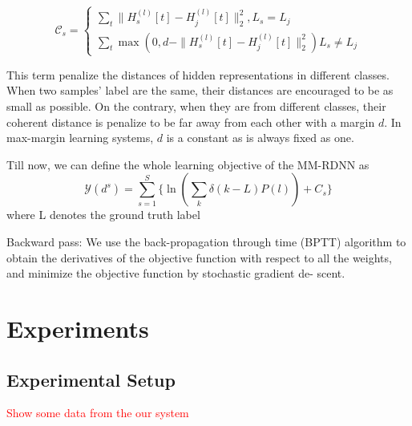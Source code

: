 \documentclass[journal]{IEEEtran}
\begin{document}
\begin{equation}
\mathcal{C}_s=
\begin{cases}
\sum_t\|H^{(l)}_s[t]-H^{(l)}_j[t]\|_2^2,  L_s=L_j\\
\sum_t \max(0,d-\|H^{(l)}_s[t]-H^{(l)}_j[t]\|_2^2)  L_s \neq L_j
\end{cases}
\end{equation}

This term penalize the distances of hidden representations in different classes. When two samples' label are the same, their distances are encouraged to be as small as possible. On the contrary, when they are from different classes, their coherent  distance is penalize to be far away from each other with a margin $d$. In max-margin learning systems, $d$ is a  constant as is always fixed  as one.

Till now, we can define the whole learning objective of the MM-RDNN as
\begin{equation}
\mathcal{Y}(d^s)= \sum_{s=1}^{S} \{ \ln(\sum_k \delta(k-L)P(l)) +C_s\}
\end{equation}
where L denotes the ground truth label


Backward pass: We use the back-propagation through time (BPTT) algorithm \cite{BPTT} to obtain the derivatives of the objective function with respect to all the weights, and minimize the objective function by stochastic gradient de- scent.
\section{Experiments}
\subsection{Experimental Setup}
\textcolor{red}{Show some data from the our system}


  

\end{document}
